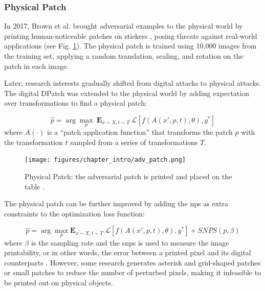 



\subsubsection{Physical Patch}

In 2017, Brown et al. brought adversarial examples to the physical world by printing human-noticeable patches on stickers \citep{brown2017patch}, posing threats against real-world applications (see Fig. \ref{fig.physical_patch}). The physical patch is trained using 10,000 images from the training set, applying a random translation, scaling, and rotation on the patch in each image.

Later, research interests gradually shifted from digital attacks to physical attacks. The digital DPatch \citep{liu2018dpatch} was extended to the physical world \citep{lee2019physical} by adding expectation over transformations to find a physical patch:

\begin{equation}
\hat{p} = \arg \underset{p}{\max}\ \mathbf{E}_{x \sim X, t \sim T}\ \mathcal{L}[f(A(x', p, t), \theta), y^*]
\end{equation}
where $A(\cdot)$ is a “patch application function” that transforms the patch
$p$ with the transformation $t$ sampled from a series of transformations $T$.

\begin{figure}[H]
\centering
\texttt{[image: figures/chapter\_intro/adv\_patch.png]}
\caption{Physical Patch: the adversarial patch is printed and placed on the table \citep{brown2017patch}.}
\label{fig.physical_patch}
\end{figure}

The physical patch can be further improved by adding the \acrfull{nps} as extra constraints to the optimization loss function:

\begin{equation}
\hat{p} = \arg \underset{p}{\max}\mathbf{E}_{x \sim X, t \sim T}\ \mathcal{L}[f(A(x', p, t), \theta), y^*] + SNPS(p, \beta)
\end{equation}
where $\beta$ is the sampling rate and the \acrfull{snps} is used to measure the image printability, or in other words, the error between a printed pixel and its digital counterparts \citep{wang2021daedalus}. However, some research generates asterisk and grid-shaped patches \citep{wu2020dpattack} or small patches \citep{huang2021rpattack} to reduce the number of perturbed pixels, making it infeasible to be printed out on physical objects.

